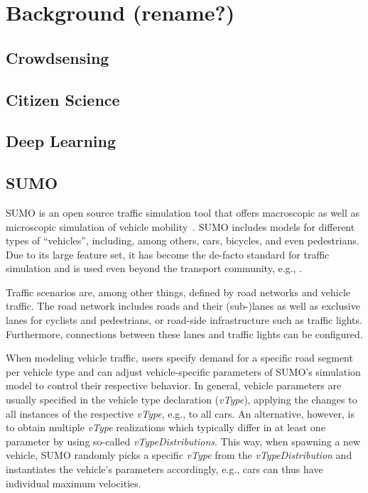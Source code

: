 \cleardoublepage
\chapter{Background (rename?)}
\label{cha:background}

\section{Crowdsensing}
\label{sec:crowdsensing_background}

\section{Citizen Science}
\label{sec:citizen_science_background}

\section{Deep Learning}
\label{sec:deep_learning_background}

\section{SUMO}
\label{sec:sumo_background}
SUMO is an open source traffic simulation tool that offers macroscopic as well as microscopic simulation of vehicle mobility~\cite{lopez2018microscopic}.
SUMO includes models for different types of ``vehicles'', including, among others, cars, bicycles, and even pedestrians.
Due to its large feature set, it has become the de-facto standard for traffic simulation and is used even beyond the transport community, e.g., \cite{beilharz2021towards}.

Traffic scenarios are, among other things, defined by road networks and vehicle traffic.
The road network includes roads and their (sub-)lanes as well as exclusive lanes for cyclists and pedestrians, or road-side infrastructure such as traffic lights.
Furthermore, connections between these lanes and traffic lights can be configured.

When modeling vehicle traffic, users specify demand for a specific road segment per vehicle type and can adjust vehicle-specific parameters of SUMO's simulation model to control their respective behavior.
In general, vehicle parameters are usually specified in the vehicle type declaration (\textit{vType}), applying the changes to all instances of the respective \textit{vType}, e.g., to all cars.
An alternative, however, is to obtain multiple \textit{vType} realizations which typically differ in at least one parameter by using so-called \textit{vTypeDistributions}.
This way, when spawning a new vehicle, SUMO randomly picks a specific \textit{vType} from the \textit{vTypeDistribution} and instantiates the vehicle's parameters accordingly, e.g., cars can thus have individual maximum velocities.

